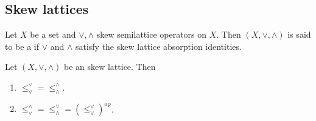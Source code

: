 \documentclass{book}
\begin{document}
	
	
	
	
	
	
	
	
	
	
	
	
	
	
	
	
	
	
	
	
	
	
	
	
	
	
	
	
	
	
	
	
	
	
	
	
	
	
	
	
	\subsection{Skew lattices}
	
	\begin{defn} 
		Let $X$ be a set and $\vee, \wedge$ skew semilattice operators on $X$. Then $(X, \vee, \wedge)$ is said to be a  if $\vee$ and $\wedge$ satisfy the skew lattice absorption identities.
	\end{defn}
	
	\begin{ex} 
		Let $(X, \vee, \wedge)$ be an skew lattice. Then 
		\begin{enumerate}
			\item $\leq_{\vee}^{\vee} = \leq_{\wedge}^{\wedge}$.
			\item $\leq_{\vee}^{\wedge} = \leq_{\wedge}^{\vee} = (\leq_{\vee}^{\vee})^{\text{op}}$.
		\end{enumerate}
	\end{ex}
	
\end{document}
